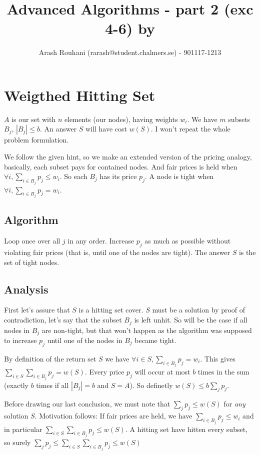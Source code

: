 \documentclass[a4paper,11pt]{article}
\title{Advanced Algorithms - part 2 (exc 4-6) by}
\author{Arash Rouhani (rarash@student.chalmers.se) - 901117-1213}
\begin{document}
\maketitle



\section{Weigthed Hitting Set}

$A$ is our set with $n$ elements (our nodes), having weights $w_i$.
We have $m$ subsets $B_j$, $|B_j| \leq b$. An answer $S$ will have cost $w(S)$.
I won't repeat the whole problem formulation.

We follow the given hint, so we make an extended version of
the pricing analogy, basically, each subset pays for contained nodes.
And fair prices is held when $\forall i, \sum_{i \in B_j} p_j \leq w_i$.
So each $B_j$ has its price $p_j$.
A node is tight when $\forall i, \sum_{i \in B_j} p_j = w_i$.

\subsection{Algorithm}

Loop once over all $j$ in any order. Increase $p_j$ as much as possible
without violating fair prices (that is, until one of the nodes are tight).
The answer $S$ is the set of tight nodes.

\subsection{Analysis}

First let's assure that $S$ is a hitting set cover. $S$ must
be a solution by proof of contradiction, let's say that
the subset $B_j$ is left unhit. So will be the case if all nodes in
$B_j$ are non-tight, but that won't happen as the algorithm
was supposed to increase $p_j$ until one of the nodes in $B_j$
became tight.

By definition of the return set $S$ we have
$\forall i \in S, \sum_{i \in B_j} p_j = w_i$.
This gives $ \sum_{i \in S} \sum_{i \in B_j} p_j = w(S)$.
Every price $p_j$ will occur at most $b$ times in the sum
(exactly $b$ times if all $|B_j| = b$ and $S = A$).
So definetly $w(S) \leq b \sum_{j} p_j$.

Before drawing our last conclusion, we must note that
$\sum_{j} p_j \leq w(S) $ for \emph{any} solution $S$.
Motivation follows:
If fair prices are held, we have
$\sum_{i \in B_j} p_j \leq w_i$ and in particular
$\sum_{i \in S} \sum_{i \in B_j} p_j \leq w(S)$.
A hitting set have hitten every subset, so surely
$\sum_{j} p_j \leq \sum_{i \in S} \sum_{i \in B_j} p_j \leq w(S)$
\end{document}
